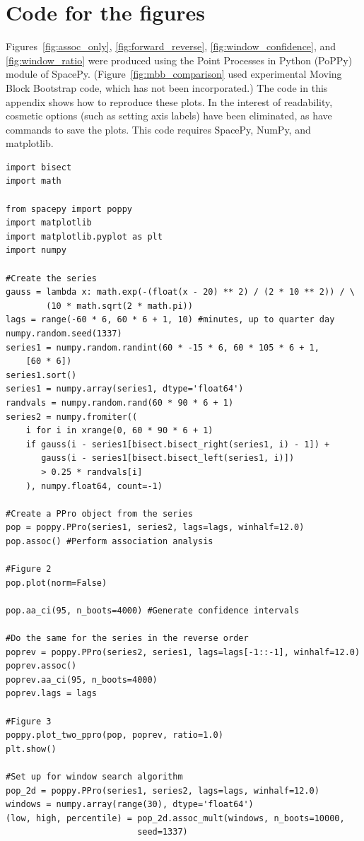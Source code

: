 \documentclass[letterpaper,11pt]{article}
\begin{document}
\section{Code for the figures}
\label{sec:code}
Figures~\ref{fig:assoc_only}, \ref{fig:forward_reverse},
\ref{fig:window_confidence}, and \ref{fig:window_ratio} were produced
using the Point Processes in Python (PoPPy) module of SpacePy.
(Figure~\ref{fig:mbb_comparison} used experimental Moving Block
Bootstrap code, which has not been incorporated.) The code in this
appendix shows how to reproduce these plots. In the interest of
readability, cosmetic options (such as setting axis labels) have been
eliminated, as have commands to save the plots. This code requires
SpacePy, NumPy, and matplotlib.  \lstset{language=Python}
\begin{lstlisting}
import bisect
import math

from spacepy import poppy
import matplotlib
import matplotlib.pyplot as plt
import numpy

#Create the series
gauss = lambda x: math.exp(-(float(x - 20) ** 2) / (2 * 10 ** 2)) / \
        (10 * math.sqrt(2 * math.pi))
lags = range(-60 * 6, 60 * 6 + 1, 10) #minutes, up to quarter day
numpy.random.seed(1337)
series1 = numpy.random.randint(60 * -15 * 6, 60 * 105 * 6 + 1,
    [60 * 6])
series1.sort()
series1 = numpy.array(series1, dtype='float64')
randvals = numpy.random.rand(60 * 90 * 6 + 1)
series2 = numpy.fromiter((
    i for i in xrange(0, 60 * 90 * 6 + 1)
    if gauss(i - series1[bisect.bisect_right(series1, i) - 1]) + 
       gauss(i - series1[bisect.bisect_left(series1, i)])
       > 0.25 * randvals[i]
    ), numpy.float64, count=-1)

#Create a PPro object from the series
pop = poppy.PPro(series1, series2, lags=lags, winhalf=12.0)
pop.assoc() #Perform association analysis

#Figure 2
pop.plot(norm=False)

pop.aa_ci(95, n_boots=4000) #Generate confidence intervals

#Do the same for the series in the reverse order
poprev = poppy.PPro(series2, series1, lags=lags[-1::-1], winhalf=12.0)
poprev.assoc()
poprev.aa_ci(95, n_boots=4000)
poprev.lags = lags

#Figure 3
poppy.plot_two_ppro(pop, poprev, ratio=1.0)
plt.show() 

#Set up for window search algorithm
pop_2d = poppy.PPro(series1, series2, lags=lags, winhalf=12.0)
windows = numpy.array(range(30), dtype='float64')
(low, high, percentile) = pop_2d.assoc_mult(windows, n_boots=10000,
                          seed=1337)


\end{lstlisting}
\end{document}
